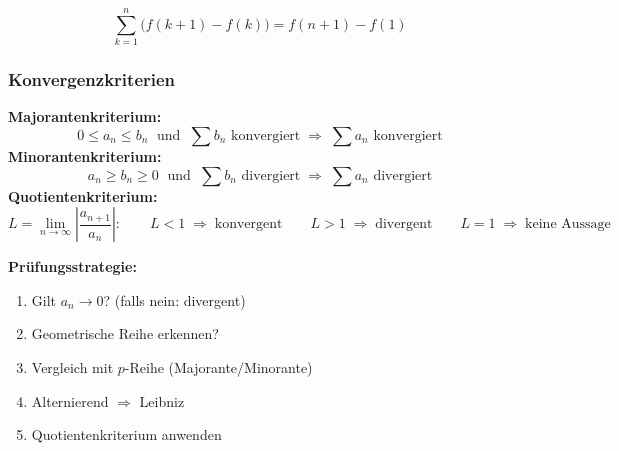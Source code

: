 \documentclass[../../zusammenfassung_AN.tex]{subfiles}
\begin{document}
	\begin{tcolorbox}[formelbox]
		\[
		\sum_{k=1}^{n}\bigl(f(k+1)-f(k)\bigr) = f(n+1)-f(1)
		\]
	\end{tcolorbox}
	
	\subsubsection{Konvergenzkriterien}
	
	\begin{tcolorbox}[dglbox, title={Konvergenzkriterien im Überblick}]
		\textbf{Majorantenkriterium:}
		\[
		0 \le a_n \le b_n \;\text{ und }\; \sum b_n \text{ konvergiert}
		\;\Rightarrow\; \sum a_n \text{ konvergiert}
		\]
		\textbf{Minorantenkriterium:}
		\[
		a_n \ge b_n \ge 0 \;\text{ und }\; \sum b_n \text{ divergiert}
		\;\Rightarrow\; \sum a_n \text{ divergiert}
		\]
		\textbf{Quotientenkriterium:}
		\[
		L = \lim_{n\to\infty}\left|\frac{a_{n+1}}{a_n}\right|:\qquad
		L<1 \;\Rightarrow\; \text{konvergent} \qquad
		L>1 \;\Rightarrow\; \text{divergent} \qquad
		L=1 \;\Rightarrow\; \text{keine Aussage}
		\]
	\end{tcolorbox}
	
	\begin{tcolorbox}[hinweis]
		\textbf{Prüfungsstrategie:}
		\begin{enumerate}[noitemsep]
			\item Gilt $a_n \to 0$? (falls nein: divergent)
			\item Geometrische Reihe erkennen?
			\item Vergleich mit $p$-Reihe (Majorante/Minorante)
			\item Alternierend $\Rightarrow$ Leibniz
			\item Quotientenkriterium anwenden
		\end{enumerate}
	\end{tcolorbox}
	
\end{document}
